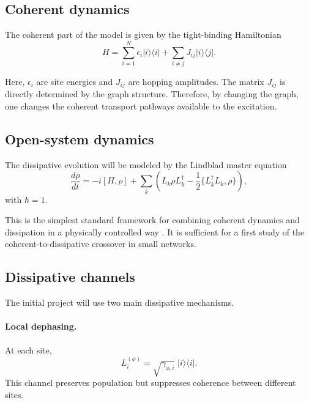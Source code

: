 \documentclass[11pt,a4paper]{article}
\begin{document}
\subsection{Coherent dynamics}

The coherent part of the model is given by the tight-binding Hamiltonian
\begin{equation}
H = \sum_{i=1}^{N}\epsilon_i |i\rangle\langle i|
  + \sum_{i\neq j} J_{ij}|i\rangle\langle j|.
\label{eq:hamiltonian}
\end{equation}

Here, $\epsilon_i$ are site energies and $J_{ij}$ are hopping amplitudes. The
matrix $J_{ij}$ is directly determined by the graph structure. Therefore, by
changing the graph, one changes the coherent transport pathways available to the
excitation.

\subsection{Open-system dynamics}

The dissipative evolution will be modeled by the Lindblad master equation
\begin{equation}
\frac{d\rho}{dt}
= -i[H,\rho]
+ \sum_k \left(
L_k \rho L_k^\dagger
- \frac{1}{2}\{L_k^\dagger L_k,\rho\}
\right),
\label{eq:lindblad}
\end{equation}
with $\hbar=1$.

This is the simplest standard framework for combining coherent dynamics and
dissipation in a physically controlled way
\citep{breuer_petruccione_2007,rivas_huelga_2012}. It is sufficient for a first
study of the coherent-to-dissipative crossover in small networks.

\subsection{Dissipative channels}

The initial project will use two main dissipative mechanisms.

\paragraph{Local dephasing.}
At each site,
\begin{equation}
L_i^{(\phi)} = \sqrt{\gamma_{\phi,i}}\; |i\rangle\langle i|.
\label{eq:dephasing}
\end{equation}
This channel preserves population but suppresses coherence between different
sites.
\end{document}
